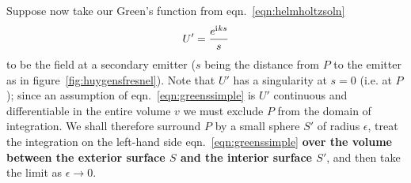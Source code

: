 Suppose now take our Green's function from eqn.~\eqref{eqn:helmholtzsoln}
%
\begin{equation}
    U' = \frac{e^{\mathrm{i}\mkern1mu k s}}{s}
\end{equation}
%
to be the field at a secondary emitter (\(s\) being the distance from \(P\) to the emitter as in figure~\ref{fig:huygensfresnel}).
%
Note that \(U'\) has a singularity at \(s = 0\) (i.e. at \(P\)); since an assumption of eqn.~\eqref{eqn:greenssimple} is \(U'\) continuous and differentiable in the entire volume \(v\) we must exclude \(P\) from the domain of integration.
%
We shall therefore surround \(P\) by a small sphere \(S'\) of radius \(\epsilon\), treat the integration on the left-hand side eqn.~\eqref{eqn:greenssimple} \textbf{over the volume between the exterior surface \(S\) and the interior surface \(S'\)}, and then take the limit as \(\epsilon \rightarrow 0\).

